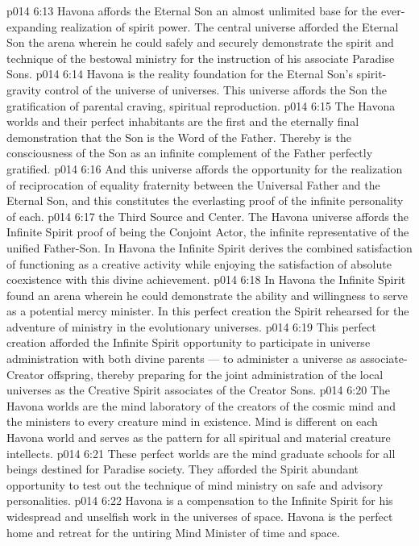 \vs p014 6:13 Havona affords the Eternal Son an almost unlimited base for the ever\hyp{}expanding realization of spirit power. The central universe afforded the Eternal Son the arena wherein he could safely and securely demonstrate the spirit and technique of the bestowal ministry for the instruction of his associate Paradise Sons.
\vs p014 6:14 Havona is the reality foundation for the Eternal Son’s spirit\hyp{}gravity control of the universe of universes. This universe affords the Son the gratification of parental craving, spiritual reproduction.
\vs p014 6:15 The Havona worlds and their perfect inhabitants are the first and the eternally final demonstration that the Son is the Word of the Father. Thereby is the consciousness of the Son as an infinite complement of the Father perfectly gratified.
\vs p014 6:16 And this universe affords the opportunity for the realization of reciprocation of equality fraternity between the Universal Father and the Eternal Son, and this constitutes the everlasting proof of the infinite personality of each.
\vs p014 6:17 \pc {}\bibnobreakspace {} the Third Source and Center. The Havona universe affords the Infinite Spirit proof of being the Conjoint Actor, the infinite representative of the unified Father\hyp{}Son. In Havona the Infinite Spirit derives the combined satisfaction of functioning as a creative activity while enjoying the satisfaction of absolute coexistence with this divine achievement.
\vs p014 6:18 In Havona the Infinite Spirit found an arena wherein he could demonstrate the ability and willingness to serve as a potential mercy minister. In this perfect creation the Spirit rehearsed for the adventure of ministry in the evolutionary universes.
\vs p014 6:19 This perfect creation afforded the Infinite Spirit opportunity to participate in universe administration with both divine parents --- to administer a universe as associate\hyp{}Creator offspring, thereby preparing for the joint administration of the local universes as the Creative Spirit associates of the Creator Sons.
\vs p014 6:20 The Havona worlds are the mind laboratory of the creators of the cosmic mind and the ministers to every creature mind in existence. Mind is different on each Havona world and serves as the pattern for all spiritual and material creature intellects.
\vs p014 6:21 These perfect worlds are the mind graduate schools for all beings destined for Paradise society. They afforded the Spirit abundant opportunity to test out the technique of mind ministry on safe and advisory personalities.
\vs p014 6:22 Havona is a compensation to the Infinite Spirit for his widespread and unselfish work in the universes of space. Havona is the perfect home and retreat for the untiring Mind Minister of time and space.
